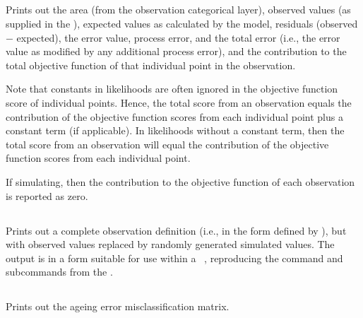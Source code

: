 \subsection{}

Prints out the area (from the observation categorical layer), observed values (as supplied in the \config), expected values as calculated by the model, residuals (observed $-$ expected), the error value, process error, and the total error (i.e., the error value as modified by any additional process error), and the contribution to the total objective function of that individual point in the observation. 

Note that constants in likelihoods are often ignored in the objective function score of individual points. Hence, the total score from an observation equals the contribution of the objective function scores from each individual point plus a constant term (if applicable). In likelihoods without a constant term, then the total score from an observation will equal the contribution of the objective function scores from each individual point.

If simulating, then the contribution to the objective function of each observation is reported as zero. 

\subsection{}

Prints out a complete observation definition (i.e., in the form defined by ), but with observed values replaced by randomly generated simulated values. The output is in a form  suitable for use within a \SPM\ \config, reproducing the command and subcommands from the \config.

\subsection{}\label{sec:ageingerrorreport}

Prints out the ageing error misclassification matrix.

\subsection{}


